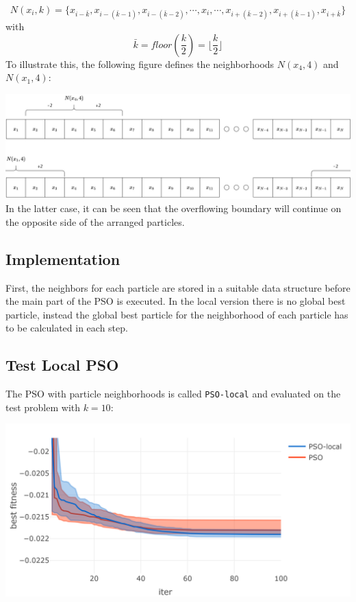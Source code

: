 \documentclass[
  oneside]{book}
\begin{document}
\[
  N(x_i, k) = \{ x_{i-\bar{k}}, x_{i-(\bar{k}-1)}, x_{i-(\bar{k}-2)}, \cdots, x_{i}, \cdots, x_{i+(\bar{k}-2)}, x_{i+(\bar{k}-1)}, x_{i+\bar{k}} \}
\]
with
\[
  \bar{k} = floor(\frac{k}{2}) = \lfloor \frac{k}{2} \rfloor
\]
To illustrate this, the following figure defines the neighborhoods \(N(x_4, 4)\) and \(N(x_1, 4)\):

\includegraphics{img/PSO_local_chart.jpg}
In the latter case, it can be seen that the overflowing boundary will continue on the opposite side of the arranged particles.

\hypertarget{implementation-1}{%
\subsection{Implementation}\label{implementation-1}}

First, the neighbors for each particle are stored in a suitable data structure before the main part of the PSO is executed. In the local version there is no global best particle, instead the global best particle for the neighborhood of each particle has to be calculated in each step.

\hypertarget{test-local-pso}{%
\subsection{Test Local PSO}\label{test-local-pso}}

The PSO with particle neighborhoods is called \texttt{PSO-local} and evaluated on the test problem with \(k=10\):

\includegraphics{Master_Thesis_files/figure-latex/variants5-1.png}
\end{document}
